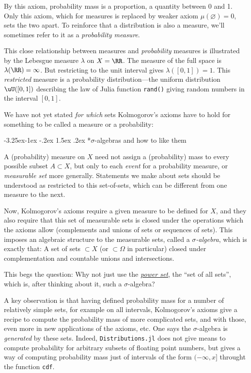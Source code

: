\documentclass{juliacon}
\makeatletter
\renewcommand\subsection{\@startsection{subsection}{2}{\z@}%
{-3.25ex\@plus -1ex \@minus -.2ex}%
{1.5ex \@plus .2ex}%
{\normalfont\bfseries}}
\makeatother
\begin{document}
By this axiom, probability mass is a proportion, a quantity between 0 and 1. Only this axiom, which for measures is replaced by weaker axiom $\mu(\varnothing) = 0$, sets the two apart. To reinforce that a distribution is also a measure, we'll sometimes refer to it as a \emph{probability measure}.

This close relationship between measures and \emph{probability} measures is illustrated by the Lebesgue measure $\lambda$ on $X=\RR$. The measure of the full space is $\lambda(\RR) = \infty$. But restricting to the unit interval gives $\lambda([0,1])=1$. This \emph{restricted} measure is a probability distribution---the uniform distribution $\uU([0,1])$ describing the law of Julia function \verb|rand()| giving random numbers in the interval $[0,1]$.

We have not yet stated \emph{for which} sets Kolmogorov's axioms have to hold for something to be called a measure or a probability:

\subsection*{$\sigma$-algebras and how to like them}

A (probability) measure on $X$ need not assign a (probability) mass to every possible subset $A\subset X$,
but only to each \emph{event} for a probability measure, or \emph{measurable set} more generally.
Statements we make about sets should be understood as restricted to this set-of-sets, which can be different from one measure to the next.

Now, Kolmogorov's axioms require a given measure to be defined for $X$, and they also require that this set of measurable sets is closed under the operations which the axioms allow (complements and unions of sets or sequences of sets). This imposes an algebraic structure to the measurable sets, called a \emph{$\sigma$-algebra}, which is exactly that: A set of sets $\subset X$ (or $\subset \Omega$ in particular) closed under complementation and countable unions and intersections.

This begs the question: Why not just use the \href{https://en.wikipedia.org/wiki/Power_set}{\emph{power set}}, the ``set of all sets'', which is, after thinking about it, such a $\sigma$-algebra?

A key observation is that having defined probability mass for a number of relatively simple sets, for example on all intervals,
Kolmogorov's axioms give a recipe to compute the probability mass of more complicated sets, and with those, even more in new applications of the axioms, etc.
One says the $\sigma$-algebra is \emph{generated} by these sets.
Indeed, \verb|Distributions.jl| does not give means to compute probability for arbitrary subsets of floating point numbers,
but gives a way of computing probability mass just of intervals of the form $(-\infty, x]$ throught the function \verb|cdf|.
\end{document}
